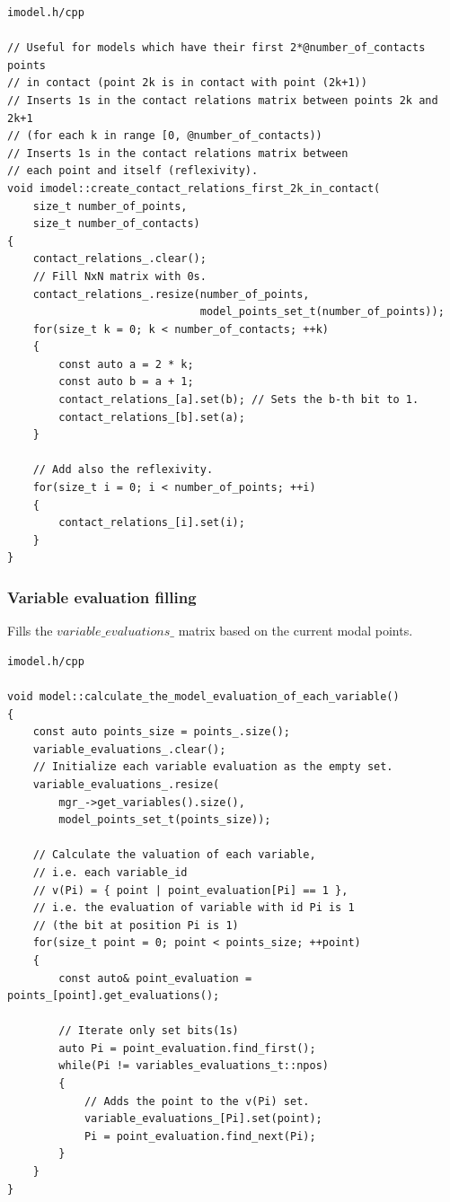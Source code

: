\documentclass{article}
\begin{document}
\newpage
\begin{lstlisting}
imodel.h/cpp

// Useful for models which have their first 2*@number_of_contacts points
// in contact (point 2k is in contact with point (2k+1))
// Inserts 1s in the contact relations matrix between points 2k and 2k+1
// (for each k in range [0, @number_of_contacts))
// Inserts 1s in the contact relations matrix between
// each point and itself (reflexivity).
void imodel::create_contact_relations_first_2k_in_contact(
	size_t number_of_points,
	size_t number_of_contacts)
{
    contact_relations_.clear();
    // Fill NxN matrix with 0s.
    contact_relations_.resize(number_of_points,
                              model_points_set_t(number_of_points));
    for(size_t k = 0; k < number_of_contacts; ++k)
    {
        const auto a = 2 * k;
        const auto b = a + 1;
        contact_relations_[a].set(b); // Sets the b-th bit to 1.
        contact_relations_[b].set(a);
    }

    // Add also the reflexivity.
    for(size_t i = 0; i < number_of_points; ++i)
    {
        contact_relations_[i].set(i);
    }
}
\end{lstlisting}

	\newpage
	\subsubsection*{Variable evaluation filling}
	Fills the $variable\_evaluations\_$ matrix based on the current modal points.
\\
\begin{lstlisting}
imodel.h/cpp

void model::calculate_the_model_evaluation_of_each_variable()
{
    const auto points_size = points_.size();
    variable_evaluations_.clear();
    // Initialize each variable evaluation as the empty set.
    variable_evaluations_.resize(
        mgr_->get_variables().size(),
        model_points_set_t(points_size));

    // Calculate the valuation of each variable,
    // i.e. each variable_id
    // v(Pi) = { point | point_evaluation[Pi] == 1 },
    // i.e. the evaluation of variable with id Pi is 1
    // (the bit at position Pi is 1)
    for(size_t point = 0; point < points_size; ++point)
    {
        const auto& point_evaluation = points_[point].get_evaluations();

        // Iterate only set bits(1s)
        auto Pi = point_evaluation.find_first();
        while(Pi != variables_evaluations_t::npos)
        {
            // Adds the point to the v(Pi) set.
            variable_evaluations_[Pi].set(point);
            Pi = point_evaluation.find_next(Pi);
        }
    }
}
\end{lstlisting}
\end{document}
